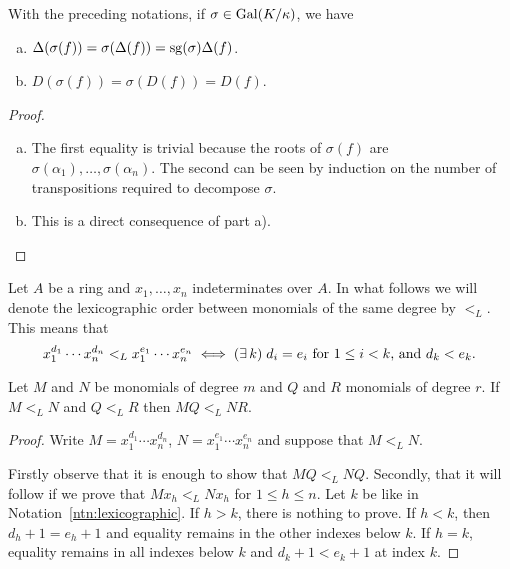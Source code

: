 \begin{lem}
    With the preceding notations, if\/ $\sigma\in\operatorname{Gal}(K/\kappa)$, we have
    \begin{enumerate}[a), font=\upshape]
        \item $\Delta(\sigma(f))=\sigma(\Delta(f))=\operatorname{sg}(\sigma)\Delta(f)$.

        \item $D(\sigma(f))=\sigma(D(f))=D(f)$.
    \end{enumerate}
\end{lem}

\begin{proof}${}$
    \begin{enumerate}[a), font=\upshape]
        \item The first equality is trivial because the roots of $\sigma(f)$ are $\sigma(\alpha_1),\dots,\sigma(\alpha_n)$. The second can be seen by induction on the number of transpositions required to decompose $\sigma$.

        \item This is a direct consequence of part a).
    \end{enumerate}
\end{proof}

\begin{ntn}\label{ntn:lexicographic}
    Let $A$ be a ring and $x_1,\dots,x_n$ indeterminates over $A$. In what follows we will denote the lexicographic order between monomials of the same degree by $<_L$. This means that
    $$
        x_1^{d_1}\cdots x_n^{d_n} <_L x_1^{e_1}\cdots x_n^{e_n}
        \iff (\exists\, k)\; d_i=e_i \text{\rm\ for } 1\le i<k \text{\rm, and }d_k<e_k.
    $$
\end{ntn}

\begin{lem}\label{lem:lexicographic-compatibility}
    Let $M$ and $N$ be monomials of degree $m$ and $Q$ and $R$ monomials of degree $r$. If $M<_L N$ and $Q<_L R$ then $MQ<_L NR$.
\end{lem}

\begin{proof}
    Write $M=x_1^{d_1}\cdots x_n^{d_n}$, $N=x_1^{e_1}\cdots x_n^{e_n}$ and suppose that $M<_LN$.
    
    Firstly observe that it is enough to show that $MQ<_LNQ$. Secondly, that it will follow if we prove that $Mx_h<_LNx_h$ for $1\le h\le n$. Let $k$ be like in Notation~\ref{ntn:lexicographic}. If $h>k$, there is nothing to prove. If $h<k$, then $d_h+1=e_h+1$ and equality remains in the other indexes below $k$. If $h=k$, equality remains in all indexes below $k$ and $d_k+1<e_k+1$ at index $k$.
\end{proof}

